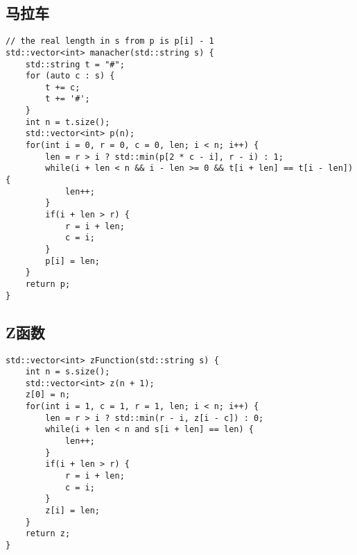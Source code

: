 \subsection{马拉车}
\begin{lstlisting}
// the real length in s from p is p[i] - 1
std::vector<int> manacher(std::string s) {
    std::string t = "#";
    for (auto c : s) {
        t += c;
        t += '#';
    }
    int n = t.size();
    std::vector<int> p(n);
    for(int i = 0, r = 0, c = 0, len; i < n; i++) {
        len = r > i ? std::min(p[2 * c - i], r - i) : 1;
        while(i + len < n && i - len >= 0 && t[i + len] == t[i - len]) {
            len++;
        }
        if(i + len > r) {
            r = i + len;
            c = i;
        }
        p[i] = len;
    }
    return p;
}
\end{lstlisting}


\subsection{Z函数}
\begin{lstlisting}
std::vector<int> zFunction(std::string s) {
    int n = s.size();
    std::vector<int> z(n + 1);
    z[0] = n;
    for(int i = 1, c = 1, r = 1, len; i < n; i++) {
        len = r > i ? std::min(r - i, z[i - c]) : 0;
        while(i + len < n and s[i + len] == len) {
            len++;
        }
        if(i + len > r) {
            r = i + len;
            c = i;
        }
        z[i] = len;
    }
    return z;
}
\end{lstlisting}



